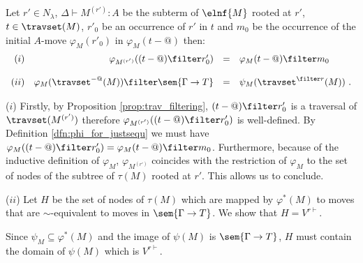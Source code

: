 \begin{lemma}
\label{lem:varphi_filter} Let $r'\in N_\lambda$, $\Delta \vdash M^{(r')} :
A$ be the subterm of $\elnf{M}$ rooted at $r'$, $t\in\travset(M)$,
$r'_0$ be an occurrence of $r'$ in $t$ and $m_0$ be the occurrence
of the initial $A$-move $\varphi_M(r'_0)$ in $\varphi_M(t-@)$ then:
$$\begin{array}{rrcl}
(i)& \varphi_{M^{(r')}}((t-@)\filter r'_0) &=& \varphi_M(t-@) \filter m_0 \\ \\
(ii) & \varphi_M(\travset^{-@}(M)) \filter \sem{\Gamma \rightarrow T} &=& \psi_M(\travset^{\filter r}(M))\ .
\end{array}
$$
\end{lemma}
\proof ($i$) Firstly, by Proposition \ref{prop:trav_filtering},
$(t-@)\filter r'_0$ is a traversal of $\travset(M^{(r')})$ therefore
$\varphi_{M^{(r')}}((t-@)\filter r'_0)$ is well-defined. By Definition
\ref{dfn:phi_for_justsequ} we must have $\varphi_{M}((t-@)\filter
r'_0) = \varphi_M(t-@) \filter m_0$. Furthermore, because of the
inductive definition of $\varphi_{M}$, $\varphi_{M^{(r')}}$ coincides with
the restriction of $\varphi_{M}$ to the set of nodes of the subtree
of $\tau(M)$ rooted at $r'$. This allows us to conclude.


($ii$) Let $H$ be the set of nodes of $\tau(M)$ which are mapped by
$\varphi^*(M)$ to moves that are $\sim$-equivalent to moves in
$\sem{\Gamma \rightarrow T}$. We show that $H = V^{r\vdash}$.

Since $\psi_M \subseteq \varphi^*(M)$ and the image of $\psi(M)$ is
$\sem{\Gamma \rightarrow T}$, $H$ must contain the domain of
$\psi(M)$ which is $V^{r\vdash}$.

